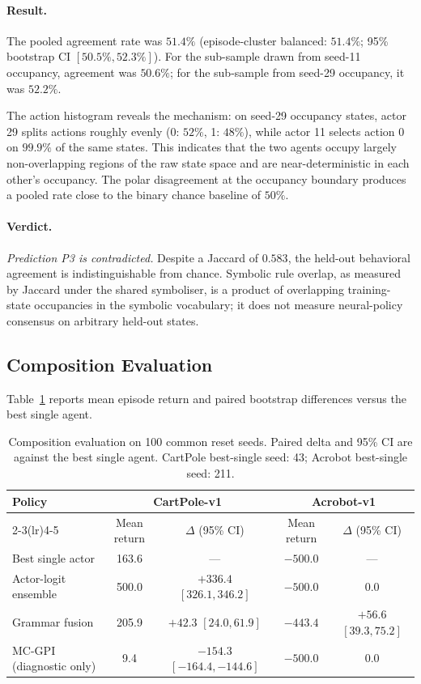 \documentclass[12pt]{article}
\begin{document}
\paragraph{Result.}
The pooled agreement rate was $51.4\%$
(episode-cluster balanced: $51.4\%$;
95\% bootstrap CI $[50.5\%, 52.3\%]$).
For the sub-sample drawn from seed-11 occupancy, agreement was $50.6\%$;
for the sub-sample from seed-29 occupancy, it was $52.2\%$.

The action histogram reveals the mechanism:
on seed-29 occupancy states, actor 29 splits actions roughly evenly
(0: $52\%$, 1: $48\%$), while actor 11 selects action 0 on $99.9\%$
of the same states.
This indicates that the two agents occupy largely non-overlapping regions
of the raw state space and are near-deterministic in each other's occupancy.
The polar disagreement at the occupancy boundary produces a pooled rate
close to the binary chance baseline of $50\%$.

\paragraph{Verdict.}
\emph{Prediction P3 is contradicted.}
Despite a Jaccard of $0.583$, the held-out behavioral agreement is
indistinguishable from chance.
Symbolic rule overlap, as measured by Jaccard under the shared symboliser,
is a product of overlapping training-state occupancies in the symbolic
vocabulary; it does not measure neural-policy consensus on arbitrary
held-out states.

\subsection{Composition Evaluation}
\label{sec:results:composition}

Table~\ref{tab:composition} reports mean episode return and paired
bootstrap differences versus the best single agent.

\begin{table}[t]
\centering
\caption{Composition evaluation on 100 common reset seeds.
  Paired delta and 95\% CI are against the best single agent.
  CartPole best-single seed: 43; Acrobot best-single seed: 211.}
\label{tab:composition}
\begin{tabular}{lcccc}
\toprule
Policy & \multicolumn{2}{c}{CartPole-v1} & \multicolumn{2}{c}{Acrobot-v1} \\
\cmidrule(lr){2-3}\cmidrule(lr){4-5}
       & Mean return & $\Delta$ (95\% CI) & Mean return & $\Delta$ (95\% CI) \\
\midrule
Best single actor        & 163.6  & ---            & $-500.0$ & --- \\
Actor-logit ensemble     & 500.0  & $+336.4$ $[326.1, 346.2]$ & $-500.0$ & $0.0$ \\
Grammar fusion           & 205.9  & $+42.3$ $[24.0, 61.9]$    & $-443.4$ & $+56.6$ $[39.3, 75.2]$ \\
MC-GPI (diagnostic only) & 9.4    & $-154.3$ $[-164.4,-144.6]$ & $-500.0$ & $0.0$ \\
\bottomrule
\end{tabular}
\end{table}
\end{document}
